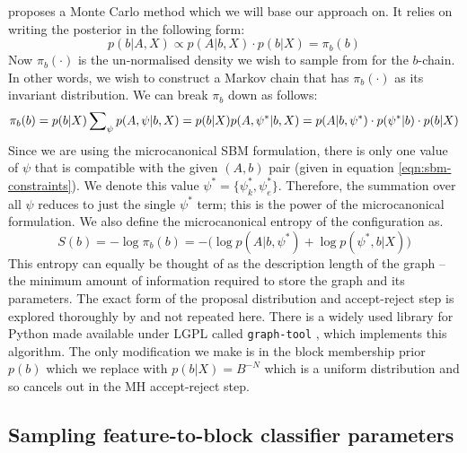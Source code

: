 \citet{Peixoto-MCMC} proposes a Monte Carlo method which we will base our approach on. It relies on writing the posterior in the following form:
%
\begin{equation}
	p(b | A, X) \propto p(A | b, X) \cdot p(b | X) = \pi_b(b)
\end{equation}
%
Now $\pi_b(\cdot)$ is the un-normalised density we wish to sample from for the $b$-chain. In other words, we wish to construct a Markov chain that has $\pi_b(\cdot)$ as its invariant distribution. We can break $\pi_b$ down as follows:
%
\begin{equation}
	\pi_b(b) = p(b|X) \sum_{\psi} \nolimits p(A , \psi | b, X) \\
	= p(b|X) p(A, \psi^* | b, X) \\
	= p(A | b, \psi^*) \cdot p(\psi^* | b) \cdot p(b | X)
\end{equation}
%
Since we are using the microcanonical SBM formulation, there is only one value of $\psi$ that is compatible with the given $(A, b)$ pair (given in equation \ref{eqn:sbm-constraints}). We denote this value $\psi^* = \{\psi_k^*, \psi_e^*\}$. Therefore, the summation over all $\psi$ reduces to just the single $\psi^*$ term; this is the power of the microcanonical formulation. We also define the microcanonical entropy of the configuration as.
%
\begin{equation}
	S(b) = - \log \pi_b(b) = - \Big( \log p(A | b, \psi^*) + \log p(\psi^*, b | X) \Big)
	\label{eqn:dl-form}
\end{equation}
%
This entropy can equally be thought of as the description length of the graph -- the minimum amount of information required to store the graph and its parameters. The exact form of the proposal distribution and accept-reject step is explored thoroughly by \citet{Peixoto-MCMC} and not repeated here. There is a widely used library for Python made available under LGPL called \verb*|graph-tool| \cite{peixoto_graph-tool_2014}, which implements this algorithm. The only modification we make is in the block membership prior $p(b)$ which we replace with $p(b|X)=B^{-N}$ which is a uniform distribution and so cancels out in the MH accept-reject step.

\subsection{Sampling feature-to-block classifier parameters}

